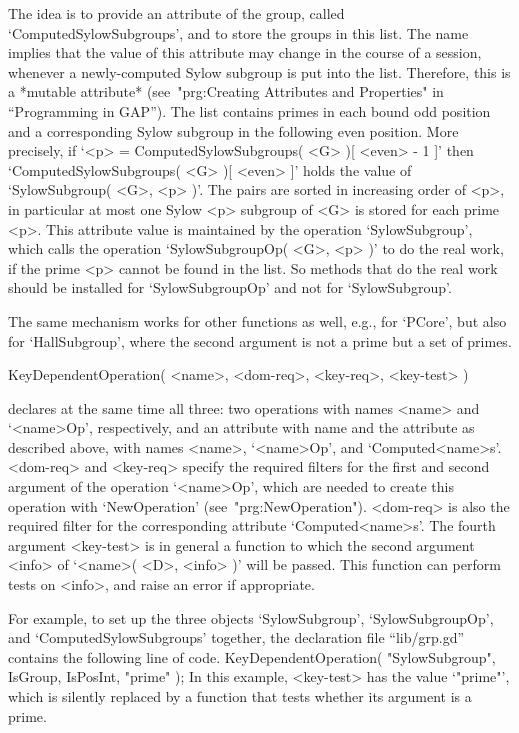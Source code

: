 The idea is to provide an attribute of the group,
called `ComputedSylowSubgroups', and to store the groups in this list.
The name implies that the value of this attribute may change in the course
of a {\GAP} session,
whenever a newly-computed Sylow subgroup is put into the list.
Therefore, this is a *mutable attribute*
(see~"prg:Creating Attributes and Properties" in ``Programming in GAP'').
The list contains primes in each bound odd position and a corresponding
Sylow subgroup in the following even position.
More precisely, if `<p> = ComputedSylowSubgroups( <G> )[ <even> - 1 ]'
then `ComputedSylowSubgroups( <G> )[ <even> ]' holds the value
of `SylowSubgroup( <G>, <p> )'.
The pairs are sorted in increasing order of <p>,
in particular at most one Sylow <p> subgroup of <G> is stored for each
prime <p>.
This attribute value is maintained by the operation `SylowSubgroup',
which calls the operation `SylowSubgroupOp( <G>, <p> )' to do the real
work, if the prime <p> cannot be found in the list.
So methods that do the real work should be installed for `SylowSubgroupOp'
and not for `SylowSubgroup'.

The same mechanism works for other functions as well, e.g., for `PCore',
but also for `HallSubgroup',
where the second argument is not a prime but a set of primes.

\>KeyDependentOperation( <name>, <dom-req>, <key-req>, <key-test> )

declares at the same time all three:  two operations with names <name>
and `<name>Op', respectively, and an attribute with name 
and the attribute as described above,
with names <name>, `<name>Op', and `Computed<name>s'.
<dom-req> and <key-req> specify the required filters for the first and
second argument of the operation `<name>Op',
which are needed to create this operation with `NewOperation'
(see~"prg:NewOperation").
<dom-req> is also the required filter for the corresponding attribute
`Computed<name>s'.
The fourth argument <key-test> is in general a function to which the second
argument <info> of `<name>(  <D>, <info> )' will be passed.
This function can perform tests on <info>,
and raise an error if appropriate.

For example, to set up the three objects `SylowSubgroup', `SylowSubgroupOp',
and `ComputedSylowSubgroups' together,
the declaration file ``lib/grp.gd'' contains the following line of code.
\begintt
KeyDependentOperation( "SylowSubgroup", IsGroup, IsPosInt, "prime" );
\endtt
In this example, <key-test> has the value `"prime"',
which is silently replaced by a function that tests whether its argument
is a prime.

